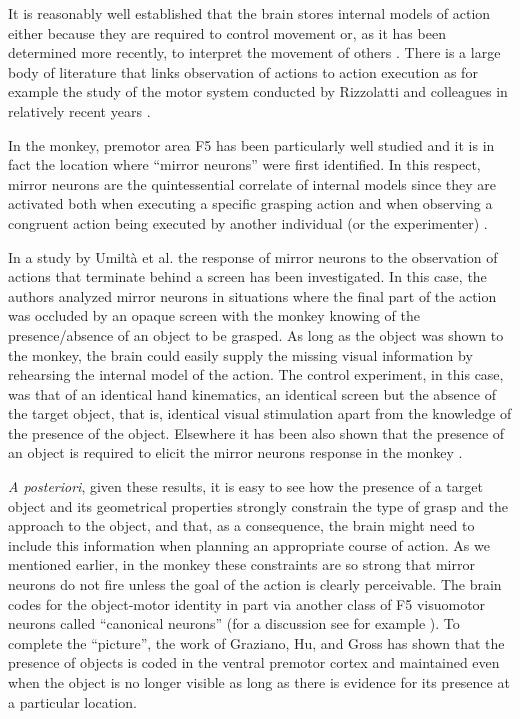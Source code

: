 It is reasonably well established that the brain stores internal
models of action either because they are required to control movement
or, as it has been determined more recently, to interpret the movement
of others \cite{kawato-99, wolpert-03, mussaivaldi-00, lackner-98}.
There is a large body of literature that links observation of actions
to action execution as for example the study of the motor system
conducted by Rizzolatti and colleagues in relatively recent years
\cite{rizzolatti-04,gallese-96,rizzolatti-01}.

In the monkey, premotor area F5 has been particularly well studied and
it is in fact the location where ``mirror neurons'' were first
identified. In this respect, mirror neurons are the quintessential
correlate of internal models since they are activated both when
executing a specific grasping action and when observing a congruent
action being executed by another individual (or the experimenter)
\cite{fadiga-00}.

In a study by Umilt\`a et al. \cite{umilta-01} the response of mirror
neurons to the observation of actions that terminate behind a screen
has been investigated. In this case, the authors analyzed mirror
neurons in situations where the final part of the action was occluded
by an opaque screen with the monkey knowing of the presence/absence of
an object to be grasped. As long as the object was shown to the
monkey, the brain could easily supply the missing visual information
by rehearsing the internal model of the action. The control
experiment, in this case, was that of an identical hand kinematics, an
identical screen but the absence of the target object, that is,
identical visual stimulation apart from the knowledge of the presence
of the object. Elsewhere it has been also shown that the presence of
an object is required to elicit the mirror neurons response in the
monkey \cite{gallese-96}.

{\em A posteriori}, given these results, it is easy to see how the
presence of a target object and its geometrical properties strongly
constrain the type of grasp and the approach to the object, and that,
as a consequence, the brain might need to include this information
when planning an appropriate course of action.  As we mentioned
earlier, in the monkey these constraints are so strong that mirror
neurons do not fire unless the goal of the action is clearly
perceivable. The brain codes for the object-motor identity in part via
another class of F5 visuomotor neurons called ``canonical neurons''
(for a discussion see for example \cite{metta-06}).  To complete the
``picture'', the work of Graziano, Hu, and Gross \cite{graziano-97}
has shown that the presence of objects is coded in the ventral
premotor cortex and maintained even when the object is no longer
visible as long as there is evidence for its presence at a particular
location.

